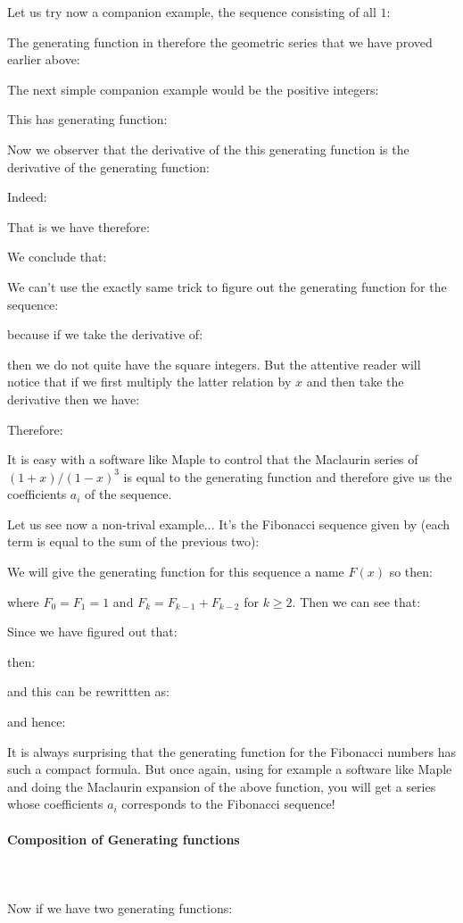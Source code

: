 	Let us try now a companion example, the sequence consisting of all $1$:
	
	The generating function in therefore the geometric series that we have proved earlier above:
	
	The next simple companion example would be the positive integers:
	
	This has generating function:
	
	Now we observer that the derivative of the this generating function is the derivative of the generating function:
	
	Indeed:
	
	That is we have therefore:
	
	We conclude that:
	
	We can't use the exactly same trick to figure out the generating function for the sequence:
	
	because if we take the derivative of:
	
	then we do not quite have the square integers. But the attentive reader will notice that if we first multiply the latter relation by $x$ and then take the derivative then we have:
	
	Therefore:
	
	It is easy with a software like Maple to control that the Maclaurin series of $(1+x)/(1-x)^3$ is equal to the generating function and therefore give us the coefficients $a_i$ of the sequence.
	
	Let us see now a non-trival example... It's the Fibonacci sequence given by (each term is equal to the sum of the previous two):
	
	We will give the generating function for this sequence a name $F(x)$ so then:
	
	where $F_0=F_1=1$ and $F_k=F_{k-1}+F_{k-2}$ for $k\geq 2$. Then we can see that:
	
	Since we have figured out that:
	
	then:
	
	and this can be rewrittten as:
	
	and hence:
	
	It is always surprising that the generating function for the Fibonacci numbers has such a compact formula. But once again, using for example a software like Maple and doing the Maclaurin expansion of the above function, you will get a series whose coefficients $a_i$ corresponds to the Fibonacci sequence!
		
	\paragraph{Composition of Generating functions}\mbox{}\\\\
	Now if we have two generating functions:
	

